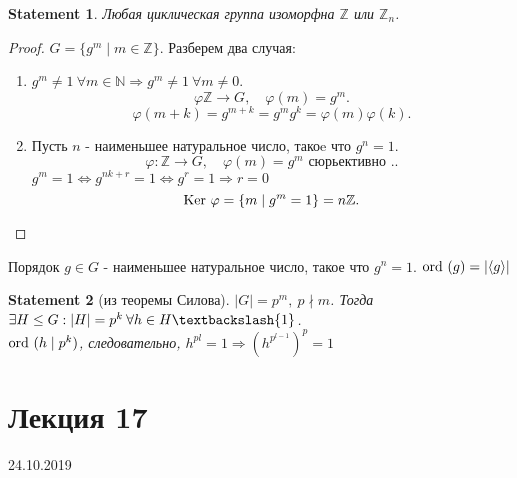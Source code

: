 \documentclass[11pt]{book}
\newcommand{\Z}{\mathbb{Z}}
\newcommand{\N}{\mathbb{N}}
\newcommand{\ke}{{\mathop{\text{\rm Ker}}}~}
\newcommand{\ord}{{\mathop{\text{\rm ord}}}~}
\theoremstyle{definition}
\theoremstyle{plain}
\theoremstyle{plain}
\newtheorem*{st}{Statement}
\theoremstyle{definition}
\theoremstyle{remark}
\begin{document}
\begin{st}
    Любая циклическая группа изоморфна $\Z$ или $\Z_n$.
\end{st}
\begin{proof}
    $G = \{g^m \mid m \in \Z\}$. Разберем два случая:
     \begin{enumerate}
	 \item $g^m \ne 1 \: \forall m \in  \N  \Rightarrow g^m \ne 1 \: \forall m \ne 0$. 
	     \[
		 \varphi  \Z \to  G, \quad \varphi (m) = g^m
	     .\] 
	     \[
		 \varphi (m+k) = g^{m+k} = g^m g^k = \varphi (m) \varphi (k)
	     .\] 
	 \item Пусть $n$ - наименьшее натуральное число, такоe что $g^n = 1$. 
	     \[
		 \varphi : \Z \to G, \quad \varphi (m) = g^m \mbox{ сюрьективно }.
	     .\] 
	     $g^m = 1 \Leftrightarrow g^{nk + r} = 1  \Leftrightarrow g ^r = 1 \Rightarrow r = 0$
	     \[
		 \ke \varphi  = \{m \mid g^m = 1\} = n\Z
	     .\] 
    \end{enumerate}
\end{proof}
\begin{defn}
    Порядок $g \in  G$ - наименьшее натуральное число, такое что $g^n = 1$.  $\ord(g) = | \langle g \rangle|$
\end{defn}
\begin{st}[из теоремы Силова]
    $|G| = p^m , \: p \nmid m$. Тогда $\exists H \le G: |H| = p^k \: \forall h \in  H \textbackslash {1}$.\\
    $\ord (h \mid p^k)$, следовательно,  $h^{p{l}} = 1 \Rightarrow (h^{p^{l-1}})^p =1$
\end{st}

\section{Лекция 17}
24.10.2019
\end{document}
